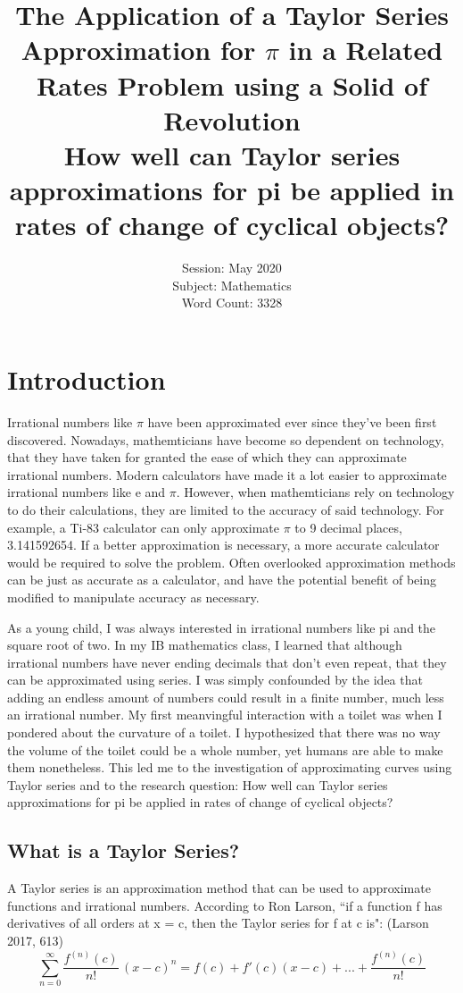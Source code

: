 \documentclass[12pt, titlepage]{article}
\date{Session: May 2020 \\ Subject: Mathematics \\ Word Count: 3328}
\title{The Application of a Taylor Series Approximation for \(\pi\) in a Related Rates Problem using a Solid of Revolution \bigskip \\  How well can Taylor series approximations for pi be applied in rates of change of cyclical objects?}
\begin{document}
\maketitle
\tableofcontents
\newpage

\section{Introduction}
Irrational numbers like \(\pi\) have been approximated ever since they've been first discovered. Nowadays, mathemticians have become so dependent on technology, that they have taken for granted the ease of which they can approximate irrational numbers. Modern calculators have made it a lot easier to approximate irrational numbers like e and \(\pi\). However, when mathemticians rely on technology to do their calculations, they are limited to the accuracy of said technology. For example, a Ti-83 calculator can only approximate \(\pi\) to 9 decimal places, 3.141592654. If a better approximation is necessary, a more accurate calculator would be required to solve the problem. Often overlooked approximation methods can be just as accurate as a calculator, and have the potential benefit of being modified to manipulate accuracy as necessary.

As a young child, I was always interested in irrational numbers like pi and the square root of two. In my IB mathematics class, I learned that although irrational numbers have never ending decimals that don't even repeat, that they can be approximated using series. I was simply confounded by the idea that adding an endless amount of numbers could result in a finite number, much less an irrational number. My first meanvingful interaction with a toilet was when I pondered about the curvature of a toilet. I hypothesized that there was no way the volume of the toilet could be a whole number, yet humans are able to make them nonetheless. This led me to the investigation of approximating curves using Taylor series and to the research question: How well can Taylor series approximations for pi be applied in rates of change of cyclical objects?

\subsection{What is a Taylor Series?}
A Taylor series is an approximation method that can be used to approximate functions and irrational numbers. According to Ron Larson, ``if a function f has derivatives of all orders at x = c, then the Taylor series for f at c is": (Larson 2017, 613)
\begin{equation}
  \sum_{n=0}^{\infty} \frac{f^{(n)}(c)}{n!} \, (x-c)^{n} = f(c) + f'(c)(x-c) + ... +  \frac{f^{(n)}(c)}{n!}
\end{equation}
\end{document}
